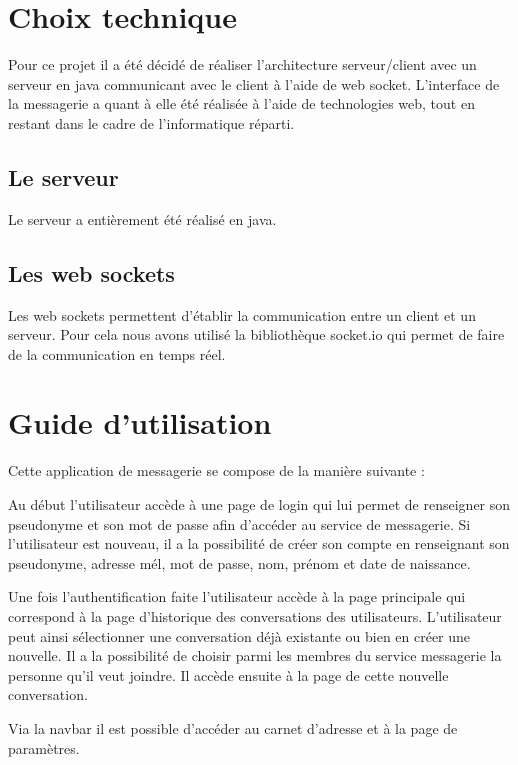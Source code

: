 \section{Choix technique}

\par Pour ce projet il a été décidé de réaliser l'architecture serveur/client avec un serveur en java communicant avec le client à l'aide de web socket. L’interface de la messagerie a quant à elle été réalisée à l'aide de technologies web, tout en restant dans le cadre de l'informatique réparti. 

\subsection{Le serveur}
Le serveur a entièrement été réalisé en java.  

\subsection{Les web sockets}
\par Les web sockets permettent d'établir la communication entre un client et un serveur. Pour cela nous avons utilisé la bibliothèque socket.io qui permet de faire de la communication en temps réel. 


\section{Guide d'utilisation}

\par Cette application de messagerie se compose de la manière suivante : \\

\par Au début l'utilisateur accède à une page de login qui lui permet de renseigner son pseudonyme et son mot de passe afin d'accéder au service de messagerie. Si l'utilisateur est nouveau, il a la possibilité de créer son compte en renseignant son pseudonyme, adresse mél, mot de passe, nom, prénom et date de naissance. 
\par Une fois l'authentification faite l'utilisateur accède à la page principale qui correspond à la page d'historique des conversations des utilisateurs. L'utilisateur peut ainsi sélectionner une conversation déjà existante ou bien en créer une nouvelle. Il a la possibilité de choisir parmi les membres du service messagerie la personne qu'il veut joindre. Il accède ensuite à la page de cette nouvelle conversation.
\par Via la navbar il est possible d'accéder au carnet d'adresse et à la page de paramètres. \\

